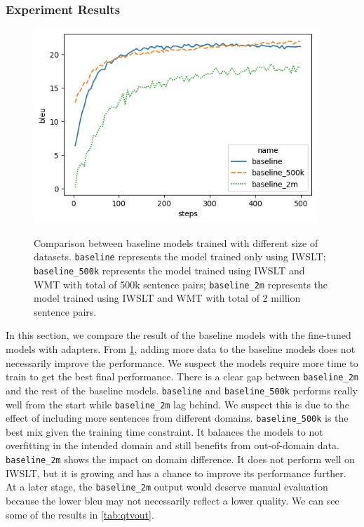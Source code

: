 \subsubsection{Experiment Results}
\begin{figure}[h]
    {\includegraphics[width=0.95\textwidth]{img/baseline.png}}
    \centering
    \caption[Comparison between baseline models trained with different size of datasets.]{
        Comparison between baseline models trained with different size of datasets. \texttt{baseline} represents the model trained only using IWSLT; \texttt{baseline\_500k} represents the model trained using IWSLT and WMT with total of 500k sentence pairs; \texttt{baseline\_2m} represents the model trained using IWSLT and WMT with total of 2 million sentence pairs.}
    \label{img:basecomp}
\end{figure}

In this section, we compare the result of the baseline models with the fine-tuned models with adapters. From \cref{img:basecomp}, adding more data to the baseline models does not necessarily improve the performance. We suspect the models require more time to train to get the best final performance. There is a clear gap between \texttt{baseline\_2m} and the rest of the baseline models. \texttt{baseline} and \texttt{baseline\_500k} performs really well from the start while \texttt{baseline\_2m} lag behind. We suspect this is due to the effect of including more sentences from different domains. \texttt{baseline\_500k} is the best mix given the training time constraint. It balances the models to not overfitting in the intended domain and still benefits from out-of-domain data. \texttt{baseline\_2m} shows the impact on domain difference. It does not perform well on IWSLT, but it is growing and has a chance to improve its performance further. At a later stage, the \texttt{baseline\_2m} output would deserve manual evaluation because the lower bleu may not necessarily reflect a lower quality. We can see some of the results in \cref{tab:qtvout}.

